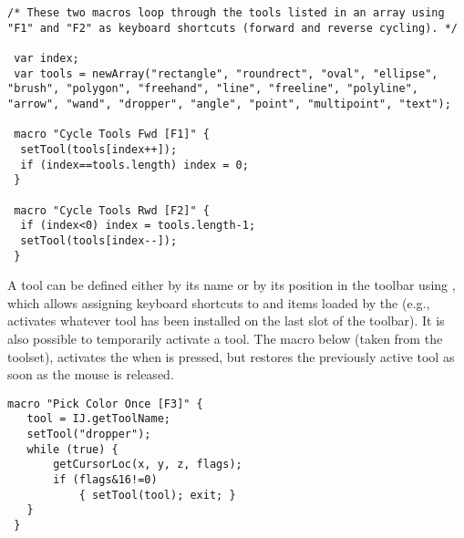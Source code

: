 \begin{lstlisting}[caption={[Cycling Through the Toolbar Using Keyboard Shortcuts]Cycling Through the Toolbar Using Keyboard
Shortcuts},label={lis:toolsShrtct2},showstringspaces=false,tabsize=4]
/* These two macros loop through the tools listed in an array using "F1" and "F2" as keyboard shortcuts (forward and reverse cycling). */

 var index;
 var tools = newArray("rectangle", "roundrect", "oval", "ellipse", "brush", "polygon", "freehand", "line", "freeline", "polyline", "arrow", "wand", "dropper", "angle", "point", "multipoint", "text");

 macro "Cycle Tools Fwd [F1]" {
  setTool(tools[index++]);
  if (index==tools.length) index = 0; 
 } 
   
 macro "Cycle Tools Rwd [F2]" {
  if (index<0) index = tools.length-1;
  setTool(tools[index--]);
 }
\end{lstlisting}


A tool can be defined either by its name or by its position in the
toolbar using ,
which allows assigning keyboard shortcuts to 
and items loaded by the  (e.g., 
activates whatever tool has been installed on the last slot of the
toolbar). It is also possible to temporarily activate a tool. The
macro below (taken from the 
toolset), activates the  when 
is pressed, but restores the previously active tool as soon as the
mouse is released.

\begin{lstlisting}[caption={Temporary Activation of a Tool},label={lis:toolsShrtct3},showstringspaces=false,tabsize=4]
 macro "Pick Color Once [F3]" {
   tool = IJ.getToolName; 
   setTool("dropper");
   while (true) {
       getCursorLoc(x, y, z, flags);
       if (flags&16!=0)
           { setTool(tool); exit; }
   }
 }
\end{lstlisting}


